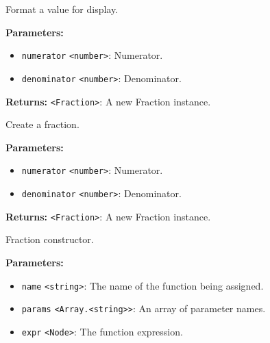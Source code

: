 \documentclass[12pt,a4paper]{article}
\begin{document}
\noindent Format a value for display.

\vspace{5mm}
\noindent {}


\noindent \textbf{Parameters:}
\begin{itemize}
  \item \texttt{numerator} \texttt{<number>}: Numerator.
  \item \texttt{denominator} \texttt{<number>}: Denominator.
\end{itemize}

\noindent \textbf{Returns:} \texttt{<Fraction>}: A new Fraction instance.

\noindent Create a fraction.

\vspace{5mm}
\noindent {}


\noindent \textbf{Parameters:}
\begin{itemize}
  \item \texttt{numerator} \texttt{<number>}: Numerator.
  \item \texttt{denominator} \texttt{<number>}: Denominator.
\end{itemize}

\noindent \textbf{Returns:} \texttt{<Fraction>}: A new Fraction instance.

\noindent Fraction constructor.

\vspace{5mm}
\noindent {}


\noindent \textbf{Parameters:}
\begin{itemize}
  \item \texttt{name} \texttt{<string>}: The name of the function being assigned.
  \item \texttt{params} \texttt{<Array.<string>>}: An array of parameter names.
  \item \texttt{expr} \texttt{<Node>}: The function expression.
\end{itemize}
\end{document}
